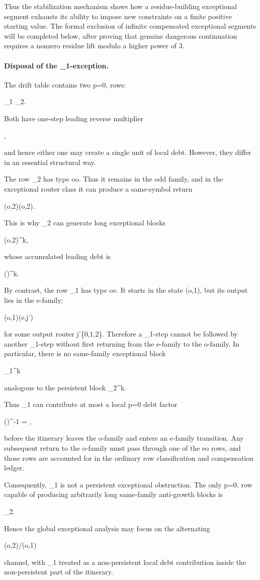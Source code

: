 \documentclass[11pt,letterpaper]{amsart}
\def\({}%
\def\){}%
\def\[{ }%
\def\]{ }%
\theoremstyle{definition}
\theoremstyle{plain}
\theoremstyle{plain}
\theoremstyle{remark}
\begin{document}
Thus the stabilization mechanism shows how a residue-building exceptional
segment exhausts its ability to impose new constraints on a finite
positive starting value.  The formal exclusion of infinite compensated
exceptional segments will be completed below, after proving that genuine
dangerous continuation requires a nonzero residue lift modulo a higher
power of \(3\).


\paragraph{Disposal of the \(\omega_1\)-exception.}
The drift table contains two \(p=0\), \(\) rows:
\[
\omega_1
\qquad{}\qquad
\Omega_2.
\]
Both have one-step leading reverse multiplier
\[
,
\]
and hence either one may create a single unit of local debt.  However,
they differ in an essential structural way.

The row \(\Omega_2\) has type \(oo\).  Thus it remains in the odd family,
and in the exceptional router class it can produce a same-symbol return
\[
(o,2)\longrightarrow(o,2).
\]
This is why \(\Omega_2\) can generate long exceptional blocks
\[
(o,2)^k,
\]
whose accumulated leading debt is
\[
\left(\right)^k.
\]

By contrast, the row \(\omega_1\) has type \(oe\).  It starts in the
state \((o,1)\), but its output lies in the \(e\)-family:
\[
(o,1)(e,j')
\]
for some output router \(j'\in\{0,1,2\}\).  Therefore a \(\omega_1\)-step
cannot be followed by another \(\omega_1\)-step without first returning
from the \(e\)-family to the \(o\)-family.  In particular, there is no
same-family exceptional block
\[
\omega_1^k
\]
analogous to the persistent block \(\Omega_2^k\).

Thus \(\omega_1\) can contribute at most a local \(p=0\) debt factor
\[
\left(\right)^{-1}
=
,
\]
before the itinerary leaves the \(o\)-family and enters an \(e\)-family
transition.  Any subsequent return to the \(o\)-family must pass through
one of the \(e\to o\) rows, and those rows are accounted for in the
ordinary row classification and compensation ledger.

Consequently, \(\omega_1\) is not a persistent exceptional obstruction.
The only \(p=0\), \(\) row capable of producing arbitrarily long
same-family anti-growth blocks is
\[
\Omega_2.
\]
Hence the global exceptional analysis may focus on the alternating
\[
(o,2)/(o,1)
\]
channel, with \(\omega_1\) treated as a non-persistent local debt contribution
inside the non-persistent part of the itinerary.
\end{document}
